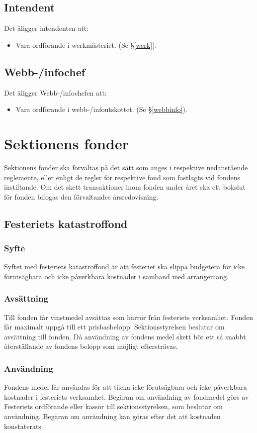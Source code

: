 \documentclass{datateknologsektionen-document}
\begin{document}
\subsection{Intendent}
\label{intendent}
Det åligger intendenten att:
\begin{itemize}
  \item Vara ordförande i werkmästeriet. (Se \S \ref{werk}).
\end{itemize}

\subsection{Webb-/infochef}
Det åligger Webb-/infochefen att:
\begin{itemize}
  \item Vara ordförande i webb-/infoutskottet. (Se \S \ref{webbinfo}).
\end{itemize}


\section{Sektionens fonder}
Sektionens fonder ska förvaltas på det sätt som anges i respektive nedanstående reglemente, eller
enligt de regler för respektive fond som fastlagts vid fondens instiftande. Om det skett
transaktioner inom fonden under året ska ett bokslut för fonden bifogas den förvaltandes
årsredovisning.
\subsection{Festeriets katastroffond}
\subsubsection{Syfte}
Syftet med festeriets katastroffond är att festeriet ska slippa budgetera för icke förutsägbara och
icke påverkbara kostnader i samband med arrangemang.
\subsubsection{Avsättning}
Till fonden får vinstmedel avsättas som härrör från festeriets verksamhet. Fonden får maximalt
uppgå till ett prisbasbelopp. Sektionsstyrelsen beslutar om avsättning till fonden.
Då användning av fondens medel skett bör ett så snabbt återställande av fondens belopp som
möjligt eftersträvas.
\subsubsection{Användning}
Fondens medel får användas för att täcka icke förutsägbara och icke påverkbara kostnader i
festeriets verksamhet. Begäran om användning av fondmedel görs av Festeriets ordförande eller
kassör till sektionsstyrelsen, som beslutar om användning. Begäran om
användning kan göras efter det att kostnaden konstaterats.
\end{document}
